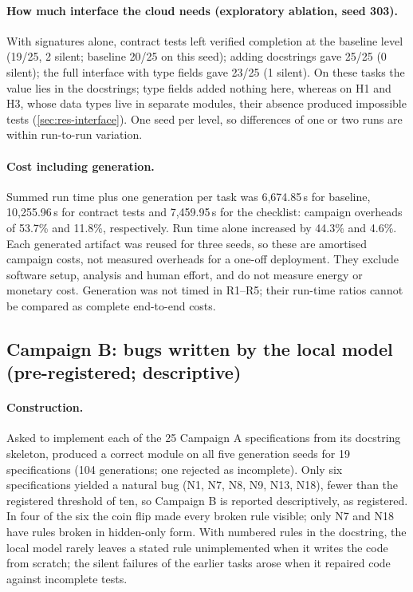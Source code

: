 \documentclass[11pt]{article}
\begin{document}
\paragraph{How much interface the cloud needs (exploratory ablation, seed 303).} With signatures alone, contract tests left verified completion at the baseline level (19/25, 2 silent; baseline 20/25 on this seed); adding docstrings gave 25/25 (0 silent); the full interface with type fields gave 23/25 (1 silent). On these tasks the value lies in the docstrings; type fields added nothing here, whereas on H1 and H3, whose data types live in separate modules, their absence produced impossible tests (\cref{sec:res-interface}). One seed per level, so differences of one or two runs are within run-to-run variation.

\paragraph{Cost including generation.} Summed run time plus one generation per task was 6{,}674.85\,s for baseline, 10{,}255.96\,s for contract tests and 7{,}459.95\,s for the checklist: campaign overheads of 53.7\% and 11.8\%, respectively. Run time alone increased by 44.3\% and 4.6\%. Each generated artifact was reused for three seeds, so these are amortised campaign costs, not measured overheads for a one-off deployment. They exclude software setup, analysis and human effort, and do not measure energy or monetary cost. Generation was not timed in R1--R5; their run-time ratios cannot be compared as complete end-to-end costs.

\subsection{Campaign B: bugs written by the local model (pre-registered; descriptive)}\label{sec:res-b}
\paragraph{Construction.} Asked to implement each of the 25 Campaign A specifications from its docstring skeleton,  produced a correct module on all five generation seeds for 19 specifications (104 generations; one rejected as incomplete). Only six specifications yielded a natural bug (N1, N7, N8, N9, N13, N18), fewer than the registered threshold of ten, so Campaign B is reported descriptively, as registered. In four of the six the coin flip made every broken rule visible; only N7 and N18 have rules broken in hidden-only form. With numbered rules in the docstring, the local model rarely leaves a stated rule unimplemented when it writes the code from scratch; the silent failures of the earlier tasks arose when it repaired code against incomplete tests.
\end{document}
